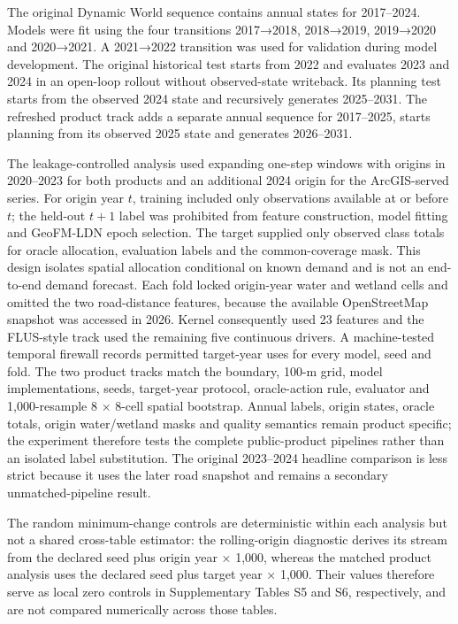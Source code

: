 The original Dynamic World sequence contains annual states for
2017--2024. Models were fit using the four transitions 2017→2018,
2018→2019, 2019→2020 and 2020→2021. A 2021→2022 transition was used for
validation during model development. The original historical test starts
from 2022 and evaluates 2023 and 2024 in an open-loop rollout without
observed-state writeback. Its planning test starts from the observed
2024 state and recursively generates 2025--2031. The refreshed product
track adds a separate annual sequence for 2017--2025, starts planning
from its observed 2025 state and generates 2026--2031.

The leakage-controlled analysis used expanding one-step windows with
origins in 2020--2023 for both products and an additional 2024 origin
for the ArcGIS-served series. For origin year \(t\), training included
only observations available at or before \(t\); the held-out \(t+1\)
label was prohibited from feature construction, model fitting and
GeoFM-LDN epoch selection. The target supplied only observed class
totals for oracle allocation, evaluation labels and the common-coverage
mask. This design isolates spatial allocation conditional on known
demand and is not an end-to-end demand forecast. Each fold locked
origin-year water and wetland cells and omitted the two road-distance
features, because the available OpenStreetMap snapshot was accessed in
2026. Kernel consequently used 23 features and the FLUS-style track used
the remaining five continuous drivers. A machine-tested temporal
firewall records permitted target-year uses for every model, seed and
fold. The two product tracks match the boundary, 100-m grid, model
implementations, seeds, target-year protocol, oracle-action rule,
evaluator and 1,000-resample 8 × 8-cell spatial bootstrap. Annual
labels, origin states, oracle totals, origin water/wetland masks and
quality semantics remain product specific; the experiment therefore
tests the complete public-product pipelines rather than an isolated
label substitution. The original 2023--2024 headline comparison is less
strict because it uses the later road snapshot and remains a secondary
unmatched-pipeline result.

The random minimum-change controls are deterministic within each
analysis but not a shared cross-table estimator: the rolling-origin
diagnostic derives its stream from the declared seed plus origin year ×
1,000, whereas the matched product analysis uses the declared seed plus
target year × 1,000. Their values therefore serve as local zero controls
in Supplementary Tables S5 and S6, respectively, and are not compared
numerically across those tables.

